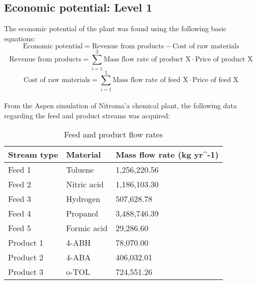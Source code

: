 \subsection{Economic potential: Level 1}
The economic potential of the plant was found using the following basic equations:
\begin{equation}
    \text{Economic potential} = \text{Revenue from products} - \text{Cost of raw materials}
\end{equation}
\begin{equation}
    \text{Revenue from products} = \displaystyle\sum_{i=1}^{3} \text{Mass flow rate of product X} \cdot \text{Price of product X}
\end{equation}
\begin{equation}
    \text{Cost of raw materials} = \displaystyle\sum_{i=1}^{5} \text{Mass flow rate of feed X} \cdot \text{Price of feed X}
\end{equation}
\\
From the Aspen simulation of Nitroma'a chemical plant, the following data regarding the feed and product streams was acquired:
\begin{table}[h] 
\centering
\caption{Feed and product flow rates}
\label{tab:costing-flows}
\begin{tabular}{lll}
    \toprule
    Stream type    & Material    & Mass flow rate (kg yr^{-1}) \\\midrule
    Feed 1     & Toluene     & 1,256,220.56                    \\
    Feed 2     & Nitric acid & 1,186,103.30                    \\
    Feed 3     & Hydrogen    & 507,628.78                      \\
    Feed 4     & Propanol    & 3,488,746.39                    \\
    Feed 5     & Formic acid & 29,286.60                       \\ 
    Product 1  & 4-ABH       & 78,070.00                       \\
    Product 2  & 4-ABA       & 406,032.01                      \\
    Product 3  & o-TOL       & 724,551.26                      \\\bottomrule
\end{tabular}
\end{table}
\\

